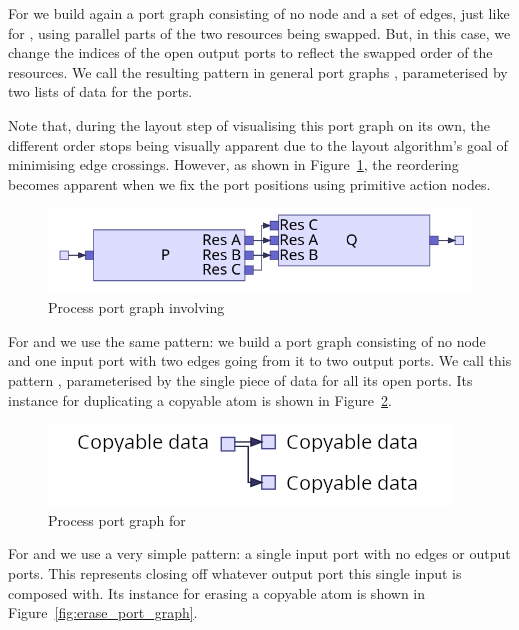 \documentclass[class=smolathesis,crop=false]{standalone}
\begin{document}
For  we build again a port graph consisting of no node and a set of edges, just like for , using parallel parts of the two resources being swapped.
But, in this case, we change the indices of the open output ports to reflect the swapped order of the resources.
We call the resulting pattern in general port graphs , parameterised by two lists of data for the ports.

Note that, during the layout step of visualising this port graph on its own, the different order stops being visually apparent due to the layout algorithm's goal of minimising edge crossings.
However, as shown in Figure~\ref{fig:swap_port_graph}, the reordering becomes apparent when we fix the port positions using primitive action nodes.

\begin{figure}[htbp]
  \centering
  \includegraphics[scale=0.5]{img/swap_port_graph_alt.png}
  \caption{Process port graph involving }
  \label{fig:swap_port_graph}
\end{figure}

For  and  we use the same pattern: we build a port graph consisting of no node and one input port with two edges going from it to two output ports.
We call this pattern , parameterised by the single piece of data for all its open ports.
Its instance for duplicating a copyable atom  is shown in Figure~\ref{fig:duplicate_port_graph}.

\begin{figure}[htbp]
  \centering
  \includegraphics[scale=0.5]{img/duplicate_port_graph.png}
  \caption{Process port graph for }
  \label{fig:duplicate_port_graph}
\end{figure}

For  and  we use a very simple pattern: a single input port with no edges or output ports.
This represents closing off whatever output port this single input is composed with.
Its instance for erasing a copyable atom  is shown in Figure~\ref{fig:erase_port_graph}.
\end{document}
